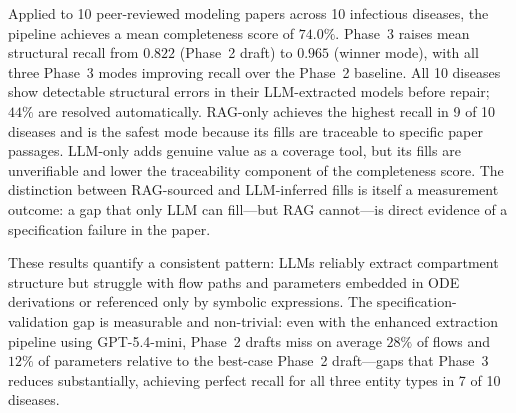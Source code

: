 Applied to 10 peer-reviewed modeling papers across 10 infectious diseases, the pipeline
achieves a mean completeness score of \textbf{$74.0\%$}. Phase~3 raises mean structural recall
from $0.822$ (Phase~2 draft) to $0.965$ (winner mode), with all three Phase~3 modes improving
recall over the Phase~2 baseline. All 10 diseases show detectable structural errors in
their LLM-extracted models before repair; $44\%$ are resolved automatically.
RAG-only achieves the highest recall in 9 of 10 diseases and is the safest mode because
its fills are traceable to specific paper passages. LLM-only adds genuine value as a
coverage tool, but its fills are unverifiable and lower the traceability component of
the completeness score. The distinction between RAG-sourced and LLM-inferred fills is
itself a measurement outcome: a gap that only LLM can fill---but RAG cannot---is direct
evidence of a specification failure in the paper.

These results quantify a consistent pattern: LLMs reliably extract compartment structure
but struggle with flow paths and parameters embedded in ODE derivations or referenced
only by symbolic expressions. The specification-validation gap is measurable and
non-trivial: even with the enhanced extraction pipeline using GPT-5.4-mini, Phase~2 drafts
miss on average $28\%$ of flows and $12\%$ of parameters relative to the best-case
Phase~2 draft---gaps that Phase~3 reduces substantially, achieving perfect recall for
all three entity types in 7 of 10 diseases.




